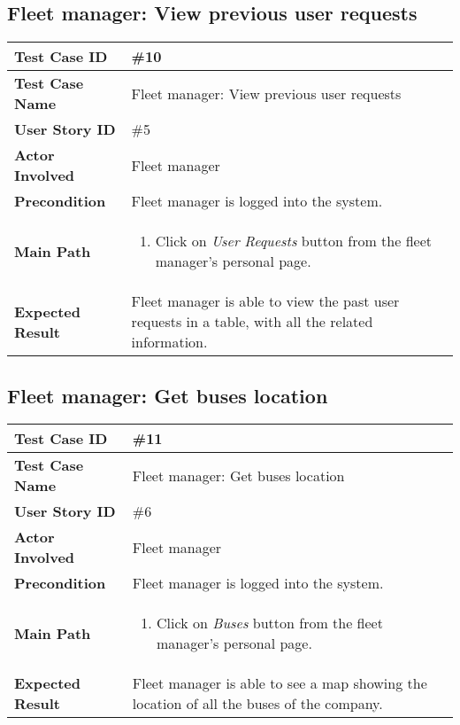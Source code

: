 \subsection{Fleet manager: View previous user requests}
\begin{center}
	\begin{tabular} { | m{3.5cm} | m{9.5cm} | }
		\hline
		\textbf{Test Case ID} & \#10\\
		\hline
		\textbf{Test Case Name} & Fleet manager: View previous user requests\\
		\hline
		\textbf{User Story ID} & \#5 \\
		\hline
		\textbf{Actor Involved} & Fleet manager\\
		\hline
		\textbf{Precondition} & Fleet manager is logged into the system.\\
		\hline
		\textbf{Main Path} & 
		\begin{enumerate}
			\item Click on \textit{User Requests} button from the fleet manager's personal page.
		\end{enumerate}\\
		\hline
		\textbf{Expected Result} & Fleet manager is able to view the past user requests in a table, with all the related information.\\
		\hline
	\end{tabular}
\end{center}
\subsection{Fleet manager: Get buses location}
\begin{center}
	\begin{tabular} { | m{3.5cm} | m{9.5cm} | }
		\hline
		\textbf{Test Case ID} & \#11\\
		\hline
		\textbf{Test Case Name} & Fleet manager: Get buses location\\
		\hline
		\textbf{User Story ID} & \#6 \\
		\hline
		\textbf{Actor Involved} & Fleet manager\\
		\hline
		\textbf{Precondition} & Fleet manager is logged into the system.\\
		\hline
		\textbf{Main Path} & 
		\begin{enumerate}
			\item Click on \textit{Buses} button from the fleet manager's personal page.
		\end{enumerate}\\
		\hline
		\textbf{Expected Result} & Fleet manager is able to see a map showing the location of all the buses of the company.\\
		\hline
	\end{tabular}
\end{center}
\newpage
